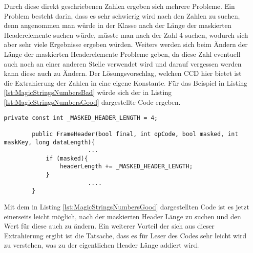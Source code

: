 \SuperPar Durch diese direkt geschriebenen Zahlen ergeben sich mehrere Probleme. Ein Problem besteht darin, dass es sehr schwierig wird nach den Zahlen zu suchen, denn angenommen man würde in der Klasse nach der Länge der maskierten Headerelemente suchen würde, müsste man nach der Zahl 4 suchen, wodurch sich aber sehr viele Ergebnisse ergeben würden. Weiters werden sich beim Ändern der Länge der maskierten Headerelemente Probleme geben, da diese Zahl eventuell auch noch an einer anderen Stelle verwendet wird und darauf vergessen werden kann diese auch zu Ändern. Der Lösungsvorschlag, welchen CCD hier bietet ist die Extrahierung der Zahlen in eine eigene Konstante. Für das Beispiel in Listing \ref{lst:MagicStringsNumbersBad}  würde sich der in Listing \ref{lst:MagicStringsNumbersGood} dargestellte Code ergeben.

\begin{lstlisting}[language={[Sharp]C}, caption=Magic number, label=lst:MagicStringsNumbersGood]
				private const int _MASKED_HEADER_LENGTH = 4;
	
        public FrameHeader(bool final, int opCode, bool masked, int maskKey, long dataLength){
						...
            if (masked){
                headerLength += _MASKED_HEADER_LENGTH;
            }
						....
        }
\end{lstlisting}

\SuperPar Mit dem in Listing \ref{lst:MagicStringsNumbersGood} dargestellten Code ist es jetzt einerseits leicht möglich, nach der maskierten Header Länge zu suchen und den Wert für diese auch zu ändern. Ein weiterer Vorteil der sich aus dieser Extrahierung ergibt ist die Tatsache, dass es für Leser des Codes sehr leicht wird zu verstehen, was zu der eigentlichen Header Länge addiert wird. 



